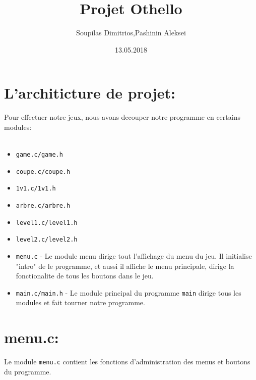 \documentclass[11pt,a4paper]{article}
\begin{document}
\title{\textbf{Projet Othello}}

\author{\large{Soupilas Dimitrios,Pashinin Aleksei}}

\date{13.05.2018}

\maketitle
\newpage

\section{L'architicture de projet:}
Pour effectuer notre jeux, nous avons decouper notre programme en certains modules:\\
\\

\begin{itemize}
  
  \item \texttt{game.c/game.h}
  \item \texttt{coupe.c/coupe.h}
  \item \texttt{1v1.c/1v1.h}
  \item \texttt{arbre.c/arbre.h}
  \item \texttt{level1.c/level1.h}
  \item \texttt{level2.c/level2.h}
  \item \texttt{menu.c} - Le module menu dirige tout l'affichage du menu du jeu. Il initialise "intro" de le programme, et aussi il affiche le menu principale, dirige la fonctionalite de tous les boutons dans le jeu. 
  \item \texttt{main.c/main.h} - Le module principal du programme \verb|main| dirige tous les modules et fait tourner notre programme.

\end{itemize}

\section{menu.c:}
Le module \verb|menu.c| contient les fonctions d'administration des menus et boutons du programme.
\end{document}
